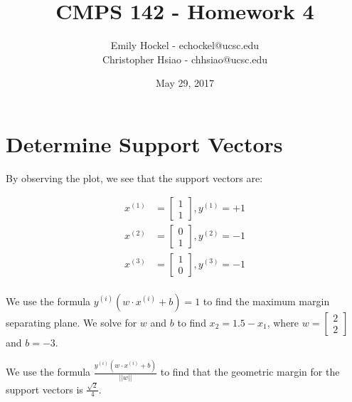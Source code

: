 \documentclass[11pt]{article}
\title{CMPS 142 - Homework 4}
\author{Emily Hockel - echockel@ucsc.edu\\Christopher Hsiao - chhsiao@ucsc.edu}
\date{May 29, 2017}
\begin{document}
\maketitle

\section{Determine Support Vectors}

\begin{center}
\end{center}

By observing the plot, we see that the support vectors are:

\begin{align*}
     x^{(1)} & = \begin{bmatrix} 1 \\ 1 \end{bmatrix}, y^{(1)} = +1 \\
    x^{(2)} & = \begin{bmatrix} 0 \\ 1 \end{bmatrix}, y^{(2)} = -1 \\
    x^{(3)} & = \begin{bmatrix} 1 \\ 0 \end{bmatrix}, y^{(3)} = -1 \\
\end{align*}
   

We use the formula $y^{(i)}(w \cdot x^{(i)} + b) = 1$ to find the maximum margin separating plane. We solve for $w$ and $b$ to find $x_2 = 1.5 - x_1$, where $w = \begin{bmatrix} 2 \\ 2 \end{bmatrix}$ and $b = -3$.

We use the formula $\frac{y^{(i)}(w \cdot x^{(i)} + b)}{||w||}$ to find that the geometric margin for the support vectors is $\frac{\sqrt{2}}{4}$.
\end{document}
